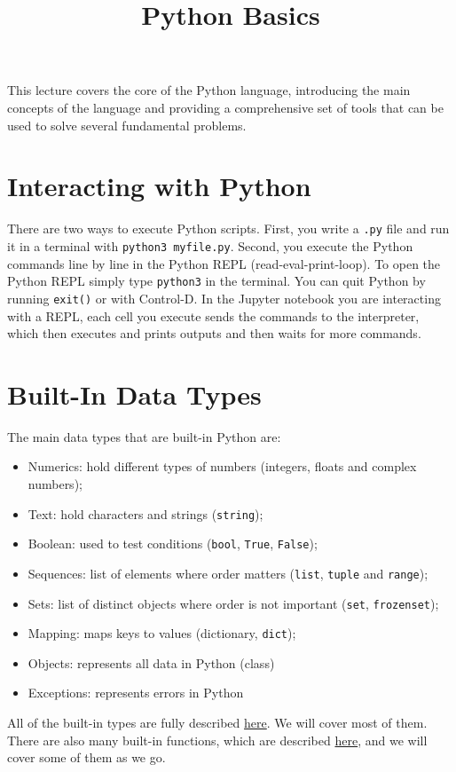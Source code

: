 \documentclass[12pt, a4paper]{article}
\date{}
\title{Python Basics}
\begin{document}
\maketitle
This lecture covers the core of the Python language, introducing the main concepts of the language and providing a comprehensive set of tools that can be used to solve several fundamental problems.
\section{Interacting with Python}
\label{sec:orgb2a27ce}
There are two ways to execute Python scripts.
First, you write a \texttt{.py} file and run it in a terminal with \texttt{python3 myfile.py}.
Second, you execute the Python commands line by line in the Python REPL (read-eval-print-loop).
To open the Python REPL simply type \texttt{python3} in the terminal. You can quit Python by running \texttt{exit()} or with Control-D.
In the Jupyter notebook you are interacting with a REPL, each cell you execute sends the commands to the interpreter, which then executes and prints outputs and then waits for more commands.
\section{Built-In Data Types}
\label{sec:orgecf282d}
The main data types that are built-in Python are:
\begin{itemize}
\item Numerics: hold different types of numbers (integers, floats and complex numbers);
\item Text: hold characters and strings (\texttt{string});
\item Boolean: used to test conditions (\texttt{bool}, \texttt{True}, \texttt{False});
\item Sequences: list of elements where order matters (\texttt{list}, \texttt{tuple} and \texttt{range});
\item Sets: list of distinct objects where order is not important (\texttt{set}, \texttt{frozenset});
\item Mapping: maps keys to values (dictionary, \texttt{dict});
\item Objects: represents all data in Python (class)
\item Exceptions: represents errors in Python
\end{itemize}
All of the built-in types are fully described \href{https://docs.python.org/3.6/library/stdtypes.html}{here}. We will cover most of them. There are also many built-in functions, which are described \href{https://docs.python.org/3.6/library/functions.html}{here}, and we will cover some of them as we go.
\end{document}
